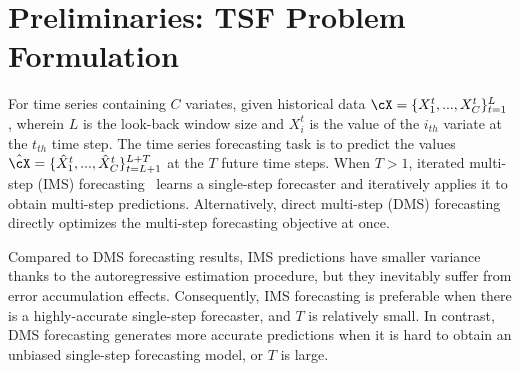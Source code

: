 \section{Preliminaries: TSF Problem Formulation}
\label{sec:related}

\label{sec:pre_problem}
For time series containing $C$ variates, given historical data $\cX=\{X^t_{1}, ..., X^t_{C}\}{_{t=1}^{L}}$, wherein $L$ is the look-back window size and  $X^t_{i}$ is the value of the $i_{th}$ variate at the $t_{th}$ time step. The time series forecasting task is to predict the values $\hat{\cX}=\{\hat{X}^t_{1}, ..., \hat{X}^t_{C}\}{_{t=L+1}^{L+T}}$ at the $T$ future time steps. 
%
When $T>1$, iterated multi-step (IMS) forecasting~\cite{taieb2012recursive} learns a single-step forecaster and iteratively applies it to obtain multi-step predictions. Alternatively, direct multi-step (DMS) forecasting~\cite{chevillon2007direct} directly optimizes the multi-step forecasting objective at once. 


Compared to DMS forecasting results, IMS predictions have smaller variance thanks to the autoregressive estimation procedure, but they inevitably suffer from error accumulation effects. Consequently, IMS forecasting is preferable when there is a highly-accurate single-step forecaster, and $T$ is relatively small. In contrast, DMS forecasting generates more accurate predictions when it is hard to obtain an unbiased single-step forecasting model, or $T$ is large. 




